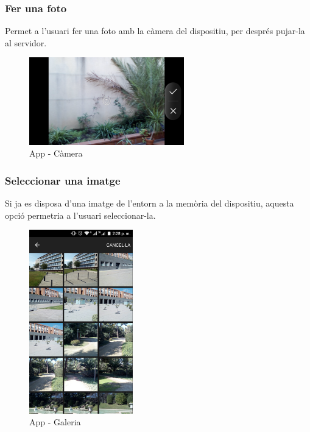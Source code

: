	\subsubsection{Fer una foto}
		Permet a l'usuari fer una foto amb la càmera del dispositiu, per després pujar-la al servidor.\\
		\begin{figure}[H]
			\centering
			\includegraphics[width=0.6\textwidth]{images/cam}
			\caption{App - Càmera}
		\end{figure}
	\subsubsection{Seleccionar una imatge}
	Si ja es disposa d'una imatge de l'entorn a la memòria del dispositiu, aquesta opció permetria a l'usuari seleccionar-la.
		\begin{figure}[H]
			\centering
			\includegraphics[width=0.4\textwidth]{images/gallery}
			\caption{App - Galeria}
		\end{figure}
